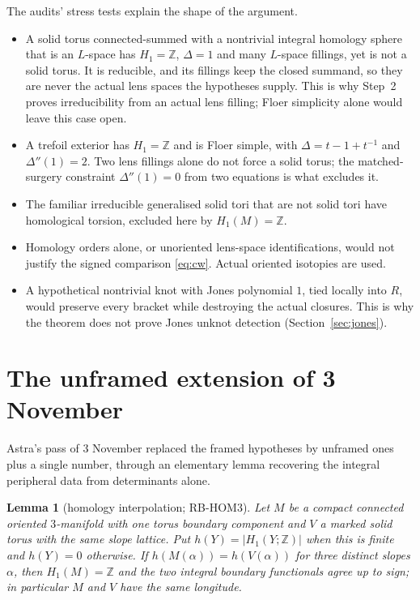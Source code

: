 \documentclass[11pt]{amsart}
\newtheorem{lemma}[theorem]{Lemma}
\theoremstyle{remark}
\newcommand{\Z}{\mathbb{Z}}
\begin{document}
The audits' stress tests explain the shape of the argument.
\begin{itemize}
\item A solid torus connected-summed with a nontrivial integral homology sphere that is an $L$-space has $H_1=\Z$, $\Delta=1$ and many $L$-space fillings, yet is not a solid torus. It is reducible, and its fillings keep the closed summand, so they are never the actual lens spaces the hypotheses supply. This is why Step~2 proves irreducibility from an actual lens filling; Floer simplicity alone would leave this case open.
\item A trefoil exterior has $H_1=\Z$ and is Floer simple, with $\Delta=t-1+t^{-1}$ and $\Delta''(1)=2$. Two lens fillings alone do not force a solid torus; the matched-surgery constraint $\Delta''(1)=0$ from two equations is what excludes it.
\item The familiar irreducible generalised solid tori that are not solid tori have homological torsion, excluded here by $H_1(M)=\Z$.
\item Homology orders alone, or unoriented lens-space identifications, would not justify the signed comparison \eqref{eq:cw}. Actual oriented isotopies are used.
\item A hypothetical nontrivial knot with Jones polynomial $1$, tied locally into $R$, would preserve every bracket while destroying the actual closures. This is why the theorem does not prove Jones unknot detection (Section~\ref{sec:jones}).
\end{itemize}

\section{The unframed extension of 3 November}

Astra's pass of 3 November replaced the framed hypotheses by unframed ones plus a single number, through an elementary lemma recovering the integral peripheral data from determinants alone.

\begin{lemma}[homology interpolation; RB-HOM3]\label{lem:interp}
Let $M$ be a compact connected oriented $3$-manifold with one torus boundary component and $V$ a marked solid torus with the same slope lattice. Put $h(Y)=|H_1(Y;\Z)|$ when this is finite and $h(Y)=0$ otherwise. If $h(M(\alpha))=h(V(\alpha))$ for three distinct slopes $\alpha$, then $H_1(M)=\Z$ and the two integral boundary functionals agree up to sign; in particular $M$ and $V$ have the same longitude.
\end{lemma}
\end{document}

